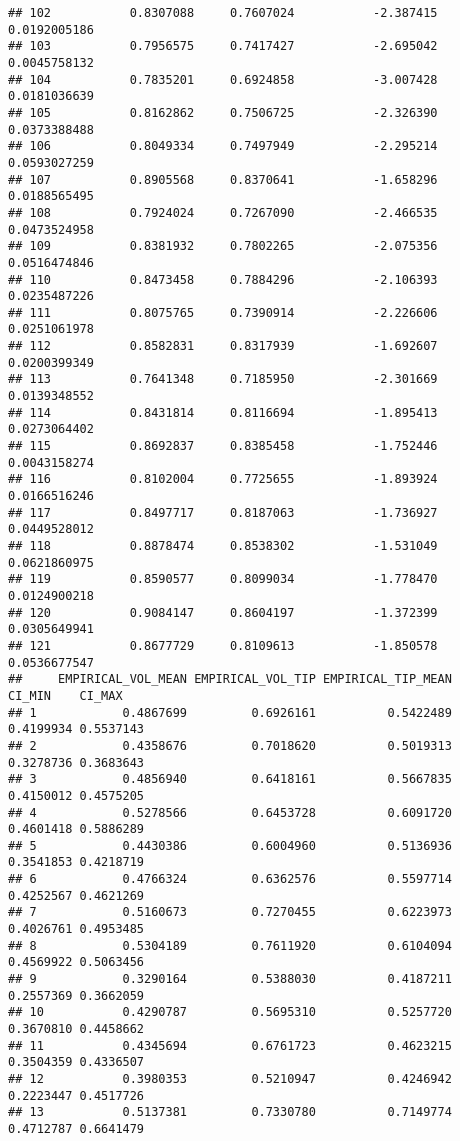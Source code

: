 \documentclass[]{article}
\begin{document}
\begin{verbatim}
## 102           0.8307088     0.7607024           -2.387415  0.0192005186
## 103           0.7956575     0.7417427           -2.695042  0.0045758132
## 104           0.7835201     0.6924858           -3.007428  0.0181036639
## 105           0.8162862     0.7506725           -2.326390  0.0373388488
## 106           0.8049334     0.7497949           -2.295214  0.0593027259
## 107           0.8905568     0.8370641           -1.658296  0.0188565495
## 108           0.7924024     0.7267090           -2.466535  0.0473524958
## 109           0.8381932     0.7802265           -2.075356  0.0516474846
## 110           0.8473458     0.7884296           -2.106393  0.0235487226
## 111           0.8075765     0.7390914           -2.226606  0.0251061978
## 112           0.8582831     0.8317939           -1.692607  0.0200399349
## 113           0.7641348     0.7185950           -2.301669  0.0139348552
## 114           0.8431814     0.8116694           -1.895413  0.0273064402
## 115           0.8692837     0.8385458           -1.752446  0.0043158274
## 116           0.8102004     0.7725655           -1.893924  0.0166516246
## 117           0.8497717     0.8187063           -1.736927  0.0449528012
## 118           0.8878474     0.8538302           -1.531049  0.0621860975
## 119           0.8590577     0.8099034           -1.778470  0.0124900218
## 120           0.9084147     0.8604197           -1.372399  0.0305649941
## 121           0.8677729     0.8109613           -1.850578  0.0536677547
##     EMPIRICAL_VOL_MEAN EMPIRICAL_VOL_TIP EMPIRICAL_TIP_MEAN    CI_MIN    CI_MAX
## 1            0.4867699         0.6926161          0.5422489 0.4199934 0.5537143
## 2            0.4358676         0.7018620          0.5019313 0.3278736 0.3683643
## 3            0.4856940         0.6418161          0.5667835 0.4150012 0.4575205
## 4            0.5278566         0.6453728          0.6091720 0.4601418 0.5886289
## 5            0.4430386         0.6004960          0.5136936 0.3541853 0.4218719
## 6            0.4766324         0.6362576          0.5597714 0.4252567 0.4621269
## 7            0.5160673         0.7270455          0.6223973 0.4026761 0.4953485
## 8            0.5304189         0.7611920          0.6104094 0.4569922 0.5063456
## 9            0.3290164         0.5388030          0.4187211 0.2557369 0.3662059
## 10           0.4290787         0.5695310          0.5257720 0.3670810 0.4458662
## 11           0.4345694         0.6761723          0.4623215 0.3504359 0.4336507
## 12           0.3980353         0.5210947          0.4246942 0.2223447 0.4517726
## 13           0.5137381         0.7330780          0.7149774 0.4712787 0.6641479

\end{verbatim}
\end{document}
